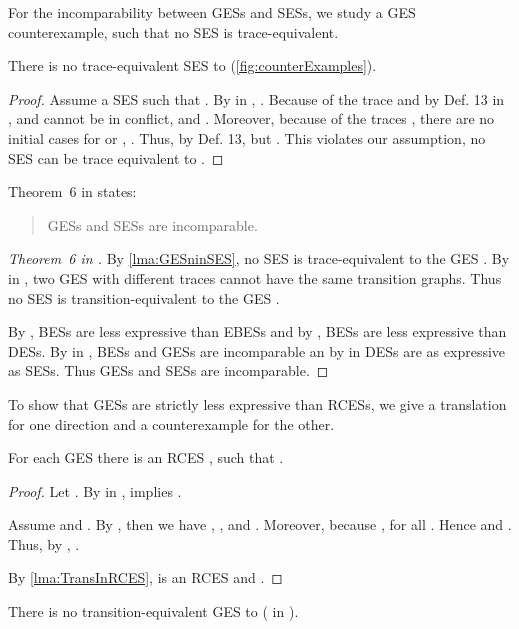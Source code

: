 \documentclass[runningheads,a4paper]{llncs}
\begin{document}
For the incomparability between GESs and SESs, we study a GES counterexample, such that no SES is trace-equivalent.
\begin{lemma}\label{lma:GESninSES}
There is no trace-equivalent SES to  (\cf \fig\ref{fig:counterExamples}).
\end{lemma}
\begin{proof}
	Assume a SES  such that .	By  in \cite{dynamicCausality15}, .	Because of the trace  and by Def. 13 in \cite{dynamicCausality15},  and  cannot be in conflict, \ie  and .	Moreover, because of the traces , there are no initial cases for  or , \ie .	Thus, by Def. 13,  but .	This violates our assumption, \ie no SES can be trace equivalent to .
\end{proof}
Theorem~6 in \cite{dynamicCausality15} states:
\begin{quote}
	GESs and SESs are incomparable.
\end{quote}
\begin{proof}[Theorem~6 in \cite{dynamicCausality15}]
	By \lem\ref{lma:GESninSES}, no SES is trace-equivalent to the GES . By  in \cite{dynamicCausality15}, two GES with different traces cannot have the same transition graphs. Thus no SES is transition-equivalent to the GES .
	
	By \cite{Langerak:Thesis}, BESs are less expressive than EBESs and by \cite{Langerak97causalambiguity}, BESs are less expressive than DESs.	By  in \cite{dynamicCausality15}, BESs and GESs are incomparable an by  in \cite{dynamicCausality15} DESs are as expressive as SESs.	Thus GESs and SESs are incomparable.
\end{proof}
To show that GESs are strictly less expressive than RCESs, we give a translation
for one direction and a counterexample for the other.
\begin{lemma}\label{lma:GESinRCES}
	For each GES  there is an RCES , such that .
\end{lemma}
\begin{proof}
	Let .	By  in \cite{dynamicCausality15},  implies .
	
	Assume  and .
	By , then we have ,	, and .	Moreover, because ,  for all .	Hence  and .	Thus, by , .
	
	By \lem\ref{lma:TransInRCES},  is an RCES and .
\end{proof}
\begin{lemma}\label{lma:GESinRCESstrictly}
	There is no transition-equivalent GES to  (\cf {} in \cite{dynamicCausality15}).
\end{lemma}
\end{document}
